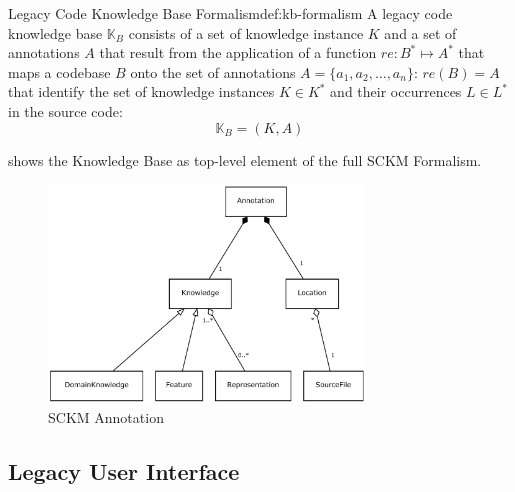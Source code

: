 \vspace{-15pt}
\begin{thesisdefinition}{Legacy Code Knowledge Base Formalism}{def:kb-formalism}
A legacy code knowledge base \(\mathbb{K}_{B}\) consists of a set of knowledge instance \(K\) and a set of annotations \(A\) that result from the application of a function \(re: B^* \mapsto A^*\) that maps a  codebase \(B\) onto the set of annotations \(A = \{a_1,a_2,\ldots,a_n\}\): \(re(B) = A\) that identify the set of knowledge instances \(K\in K^*\) and their occurrences \(L \in L^*\) in the source code:
\begin{equation}\mathbb{K}_{B} = (K, A)\label{eq:knowledgebase}\end{equation}
\end{thesisdefinition}
\vspace{-5pt}
%
 shows the Knowledge Base as top-level element of the full SCKM Formalism.

\begin{figure}[h!]
\hypertarget{fig:sckm-annotation}{%
\centering
\includegraphics[width=0.75\textwidth]{../figures/sckm-upper-uml.pdf}
\caption{SCKM Annotation}\label{fig:sckm-annotation}
}
\end{figure}

\vspace{-10pt}
\hypertarget{sec:ui-formalism}{%
\subsection{Legacy User Interface}\label{sec:ui-formalism}}
\vspace{10pt}

